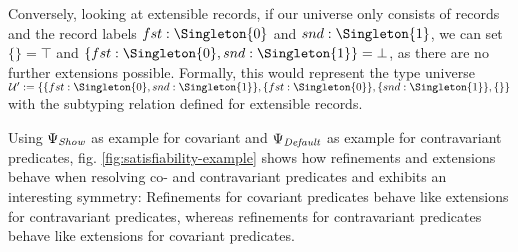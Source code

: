 Conversely, looking at extensible records, if our universe only consists of records and the record labels $fst : \Singleton{0}$ and $snd : \Singleton{1}$, we can set $\{\} = \top$ and $\{ fst : \Singleton{0}, snd : \Singleton{1} \} = \bot$, as there are no further extensions possible.
Formally, this would represent the type universe $\mathcal{U}' := \{ \{ fst : \Singleton{0}, snd : \Singleton{1} \}, \{ fst : \Singleton{0} \}, \{ snd : \Singleton{1} \}, \{\} \}$ with the subtyping relation defined for extensible records. %

Using $\Psi_\mathit{Show}$ as example for covariant and $\Psi_\mathit{Default}$ as example for contravariant predicates, fig. \ref{fig:satisfiability-example} shows how refinements and extensions behave when resolving co- and contravariant predicates and exhibits an interesting symmetry:
Refinements for covariant predicates behave like extensions for contravariant predicates, whereas refinements for contravariant predicates behave like extensions for covariant predicates.

